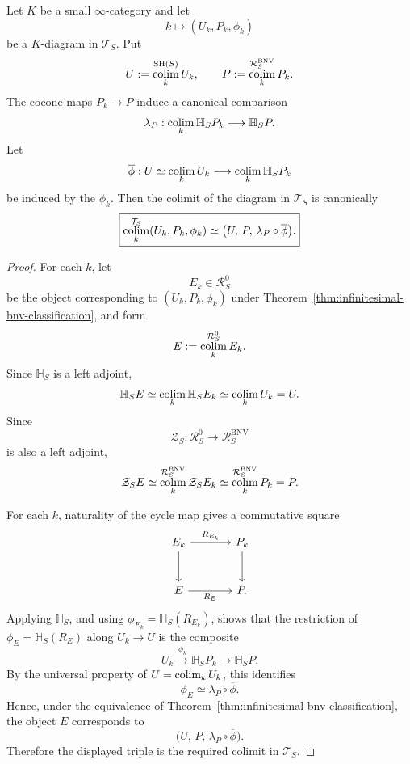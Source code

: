 \begin{proposition}
\label{prop:infinitesimal-bnv-characteristic-colimits}
Let \(K\) be a small \(\infty\)-category and let
\[
    k\longmapsto(U_k,P_k,\phi_k)
\]
be a \(K\)-diagram in \(\mathcal T_S\).  Put
\[
    U:=\operatorname*{colim}_k^{\mathrm{SH}(S)}U_k,
    \qquad
    P:=\operatorname*{colim}_k^{\mathcal R_S^{\mathrm{BNV}}}P_k.
\]
The cocone maps \(P_k\to P\) induce a canonical comparison
\[
    \lambda_P:
    \operatorname*{colim}_k\mathbb H_SP_k
    \longrightarrow
    \mathbb H_SP.
\]
Let
\[
    \overline\phi:
    U
    \simeq
    \operatorname*{colim}_kU_k
    \longrightarrow
    \operatorname*{colim}_k\mathbb H_SP_k
\]
be induced by the \(\phi_k\).  Then the colimit of the diagram in
\(\mathcal T_S\) is canonically
\[
    \boxed{
    \operatorname*{colim}_k^{\mathcal T_S}(U_k,P_k,\phi_k)
    \simeq
    \bigl(
      U,\,
      P,\,
      \lambda_P\circ\overline\phi
    \bigr).
    }
\]
\end{proposition}

\begin{proof}
For each \(k\), let
\[
    E_k\in\mathcal R_S^0
\]
be the object corresponding to \((U_k,P_k,\phi_k)\) under
Theorem~\ref{thm:infinitesimal-bnv-classification}, and form
\[
    E:=\operatorname*{colim}_k^{\mathcal R_S^0}E_k.
\]
Since \(\mathbb H_S\) is a left adjoint,
\[
    \mathbb H_SE
    \simeq
    \operatorname*{colim}_k\mathbb H_SE_k
    \simeq
    \operatorname*{colim}_kU_k
    =
    U.
\]
Since
\[
    \mathcal Z_S:
    \mathcal R_S^0
    \longrightarrow
    \mathcal R_S^{\mathrm{BNV}}
\]
is also a left adjoint,
\[
    \mathcal Z_SE
    \simeq
    \operatorname*{colim}_k^{\mathcal R_S^{\mathrm{BNV}}}\mathcal Z_SE_k
    \simeq
    \operatorname*{colim}_k^{\mathcal R_S^{\mathrm{BNV}}}P_k
    =
    P.
\]

For each \(k\), naturality of the cycle map gives a commutative square
\[
\begin{tikzcd}[column sep=large,row sep=large]
    E_k \ar[r,"R_{E_k}"] \ar[d]
        & P_k \ar[d]\\
    E \ar[r,"R_E"']
        & P.
\end{tikzcd}
\]
Applying \(\mathbb H_S\), and using
\(\phi_{E_k}=\mathbb H_S(R_{E_k})\), shows that the restriction of
\(\phi_E=\mathbb H_S(R_E)\) along \(U_k\to U\) is the composite
\[
    U_k
    \xrightarrow{\phi_k}
    \mathbb H_SP_k
    \longrightarrow
    \mathbb H_SP.
\]
By the universal property of \(U=\operatorname*{colim}_kU_k\), this identifies
\[
    \phi_E
    \simeq
    \lambda_P\circ\overline\phi.
\]
Hence, under the equivalence of
Theorem~\ref{thm:infinitesimal-bnv-classification}, the object \(E\)
corresponds to
\[
    \bigl(
      U,\,
      P,\,
      \lambda_P\circ\overline\phi
    \bigr).
\]
Therefore the displayed triple is the required colimit in
\(\mathcal T_S\).
\end{proof}

